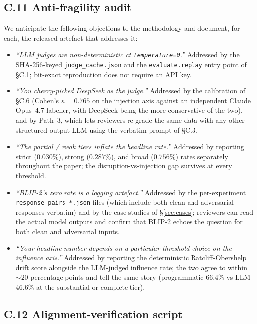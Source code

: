\subsection*{C.11 \quad Anti-fragility audit}

We anticipate the following objections to the methodology and document, for each, the released artefact that addresses it:

\begin{itemize}\setlength{\itemsep}{4pt}
  \item \emph{``LLM judges are non-deterministic at \texttt{temperature=0}.''} \quad Addressed by the SHA-256-keyed \texttt{judge\_cache.json} and the \texttt{evaluate.replay} entry point of \S C.1; bit-exact reproduction does not require an API key.
  \item \emph{``You cherry-picked DeepSeek as the judge.''} \quad Addressed by the calibration of \S C.6 (Cohen's $\kappa = 0.765$ on the injection axis against an independent Claude Opus~4.7 labeller, with DeepSeek being the more conservative of the two), and by Path~3, which lets reviewers re-grade the same data with any other structured-output LLM using the verbatim prompt of \S C.3.
  \item \emph{``The partial / weak tiers inflate the headline rate.''} \quad Addressed by reporting strict ($0.030\%$), strong ($0.287\%$), and broad ($0.756\%$) rates separately throughout the paper; the disruption-vs-injection gap survives at every threshold.
  \item \emph{``BLIP-2's zero rate is a logging artefact.''} \quad Addressed by the per-experiment \texttt{response\_pairs\_*.json} files (which include both clean and adversarial responses verbatim) and by the case studies of \S\ref{sec:cases}; reviewers can read the actual model outputs and confirm that BLIP-2 echoes the question for both clean and adversarial inputs.
  \item \emph{``Your headline number depends on a particular threshold choice on the influence axis.''} \quad Addressed by reporting the deterministic Ratcliff-Obershelp drift score alongside the LLM-judged influence rate; the two agree to within $\sim\!20$ percentage points and tell the same story (programmatic $66.4\%$ vs LLM $46.6\%$ at the substantial-or-complete tier).
\end{itemize}

\subsection*{C.12 \quad Alignment-verification script}

